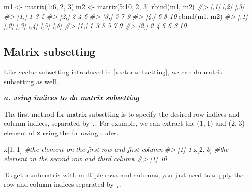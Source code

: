 \documentclass[
]{book}
\newenvironment{Shaded}{\begin{snugshade}}{\end{snugshade}}
\newcommand{\CommentTok}[1]{\textcolor[rgb]{0.56,0.35,0.01}{\textit{#1}}}
\newcommand{\DecValTok}[1]{\textcolor[rgb]{0.00,0.00,0.81}{#1}}
\newcommand{\FunctionTok}[1]{\textcolor[rgb]{0.00,0.00,0.00}{#1}}
\newcommand{\NormalTok}[1]{#1}
\newcommand{\OtherTok}[1]{\textcolor[rgb]{0.56,0.35,0.01}{#1}}
\newcommand{\SpecialCharTok}[1]{\textcolor[rgb]{0.00,0.00,0.00}{#1}}
\begin{document}
\begin{Shaded}
\begin{Highlighting}[]
\NormalTok{m1 }\OtherTok{\textless{}{-}} \FunctionTok{matrix}\NormalTok{(}\DecValTok{1}\SpecialCharTok{:}\DecValTok{6}\NormalTok{, }\DecValTok{2}\NormalTok{, }\DecValTok{3}\NormalTok{)}
\NormalTok{m2 }\OtherTok{\textless{}{-}} \FunctionTok{matrix}\NormalTok{(}\DecValTok{5}\SpecialCharTok{:}\DecValTok{10}\NormalTok{, }\DecValTok{2}\NormalTok{, }\DecValTok{3}\NormalTok{)}
\FunctionTok{rbind}\NormalTok{(m1, m2)}
\CommentTok{\#\textgreater{}      [,1] [,2] [,3]}
\CommentTok{\#\textgreater{} [1,]    1    3    5}
\CommentTok{\#\textgreater{} [2,]    2    4    6}
\CommentTok{\#\textgreater{} [3,]    5    7    9}
\CommentTok{\#\textgreater{} [4,]    6    8   10}
\FunctionTok{cbind}\NormalTok{(m1, m2)}
\CommentTok{\#\textgreater{}      [,1] [,2] [,3] [,4] [,5] [,6]}
\CommentTok{\#\textgreater{} [1,]    1    3    5    5    7    9}
\CommentTok{\#\textgreater{} [2,]    2    4    6    6    8   10}
\end{Highlighting}
\end{Shaded}

\hypertarget{matrix-subsetting}{%
\subsection{Matrix subsetting}\label{matrix-subsetting}}

Like vector subsetting introduced in \ref{vector-subsetting}, we can do matrix subsetting as well.

\textbf{\emph{a. using indices to do matrix subsetting}}

The first method for matrix subsetting is to specify the desired row indices and column indices, separated by \texttt{,}. For example, we can extract the (1, 1) and (2, 3) element of \texttt{x} using the following codes.

\begin{Shaded}
\begin{Highlighting}[]
\NormalTok{x[}\DecValTok{1}\NormalTok{, }\DecValTok{1}\NormalTok{]      }\CommentTok{\#the element on the first row and first column}
\CommentTok{\#\textgreater{} [1] 1}
\NormalTok{x[}\DecValTok{2}\NormalTok{, }\DecValTok{3}\NormalTok{]      }\CommentTok{\#the element on the second row and third column}
\CommentTok{\#\textgreater{} [1] 10}
\end{Highlighting}
\end{Shaded}

To get a submatrix with multiple rows and columns, you just need to supply the row and column indices separated by \texttt{,}.
\end{document}
